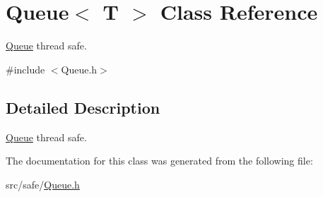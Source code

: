 \hypertarget{class_queue_3_01_t_01_4}{\section{Queue$<$ T $>$ Class Reference}
\label{class_queue_3_01_t_01_4}
}


\hyperlink{class_queue}{Queue} thread safe.  




{\ttfamily \#include $<$Queue.\-h$>$}



\subsection{Detailed Description}
\hyperlink{class_queue}{Queue} thread safe. 

The documentation for this class was generated from the following file\-:\begin{DoxyCompactItemize}
\item 
src/safe/\hyperlink{_queue_8h}{Queue.\-h}\end{DoxyCompactItemize}
